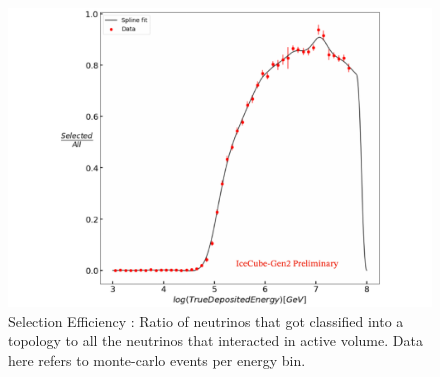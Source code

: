 \begin{figure}[h!]
    \centering
      \includegraphics{./figures/gen2/SelectionEff.pdf}
      \caption{Selection Efficiency : Ratio of neutrinos that got classified into a topology to all the neutrinos that interacted in active volume. Data here refers to monte-carlo events per energy bin.}
  \end{figure}


